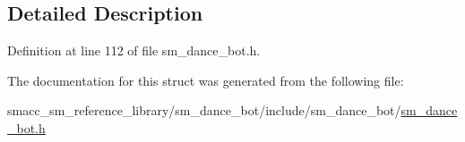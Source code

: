 \subsection{Detailed Description}


Definition at line 112 of file sm\+\_\+dance\+\_\+bot.\+h.



The documentation for this struct was generated from the following file\+:\begin{DoxyCompactItemize}
\item 
smacc\+\_\+sm\+\_\+reference\+\_\+library/sm\+\_\+dance\+\_\+bot/include/sm\+\_\+dance\+\_\+bot/\hyperlink{sm__dance__bot_8h}{sm\+\_\+dance\+\_\+bot.\+h}\end{DoxyCompactItemize}

